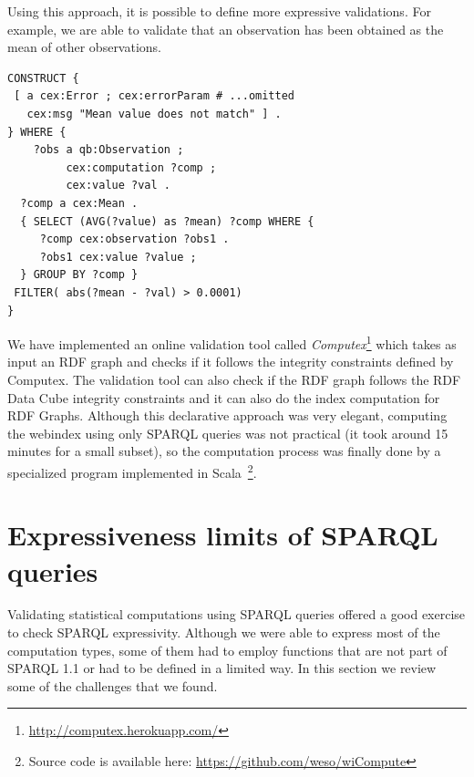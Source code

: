 \documentclass{acm_proc_article-sp}
\begin{document}
Using this approach, it is possible to define more expressive validations.
For example, we are able to validate that an observation has been obtained as
the mean of other observations. 

\begin{lstlisting}[style=SPARQL]
CONSTRUCT {
 [ a cex:Error ; cex:errorParam # ...omitted 
   cex:msg "Mean value does not match" ] . 
} WHERE { 
    ?obs a qb:Observation ;
         cex:computation ?comp ;
         cex:value ?val .
  ?comp a cex:Mean .
  { SELECT (AVG(?value) as ?mean) ?comp WHERE {
     ?comp cex:observation ?obs1 .
	 ?obs1 cex:value ?value ;
  } GROUP BY ?comp } 
 FILTER( abs(?mean - ?val) > 0.0001)
}
\end{lstlisting}

We have implemented an online validation tool called \emph{Computex}\footnote{\url{http://computex.herokuapp.com/}} which takes as
 input an RDF graph and checks if it follows the integrity constraints defined by Computex.
 The validation tool can also check if the RDF graph follows the RDF Data Cube integrity constraints
 and it can also do the index computation for RDF Graphs. 
 Although this declarative approach was very elegant, computing the webindex using only SPARQL queries
 was not practical (it took around 15 minutes for a small subset), so the computation process was finally done
 by a specialized program implemented in Scala~\footnote{Source code is available here: \url{https://github.com/weso/wiCompute}}. 
  
\section{Expressiveness limits of SPARQL queries}

Validating statistical computations using SPARQL queries offered 
 a good exercise to check SPARQL expressivity. Although we were able 
 to express most of the computation types, some of them had to employ functions
 that are not part of SPARQL 1.1 or had to be defined in a limited way. 
 In this section we review some of the challenges that we found.
\end{document}
